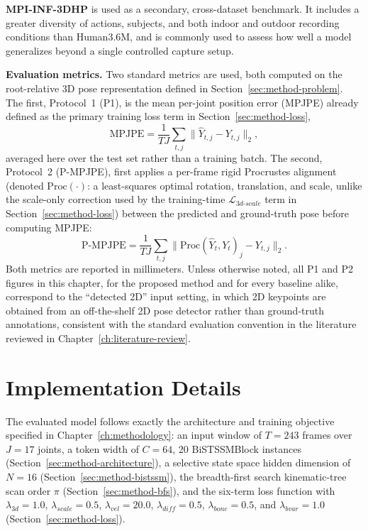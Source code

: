 \textbf{MPI-INF-3DHP} \cite{mehta2017mpiinf3dhp} is used as a secondary,
cross-dataset benchmark. It includes a greater diversity of actions,
subjects, and both indoor and outdoor recording conditions than
Human3.6M, and is commonly used to assess how well a model generalizes
beyond a single controlled capture setup.

\textbf{Evaluation metrics.} Two standard metrics are used, both computed
on the root-relative 3D pose representation defined in
Section~\ref{sec:method-problem}. The first, Protocol~1 (P1), is the mean
per-joint position error (MPJPE) already defined as the primary training
loss term in Section~\ref{sec:method-loss},
\begin{equation}
\text{MPJPE} = \frac{1}{TJ} \sum_{t,j} \big\lVert \hat{Y}_{t,j} - Y_{t,j} \big\rVert_2 ,
\end{equation}
averaged here over the test set rather than a training batch. The second,
Protocol~2 (P-MPJPE), first applies a per-frame rigid Procrustes alignment
(denoted $\mathrm{Proc}(\cdot)$: a least-squares optimal rotation,
translation, and scale, unlike the scale-only correction used by the
training-time $\mathcal{L}_{3d\text{-}scale}$ term in
Section~\ref{sec:method-loss}) between the predicted and ground-truth
pose before computing MPJPE:
\begin{equation}
\text{P-MPJPE} = \frac{1}{TJ} \sum_{t,j} \big\lVert \mathrm{Proc}(\hat{Y}_{t}, Y_{t})_{j} - Y_{t,j} \big\rVert_2 .
\end{equation}
Both metrics are reported in millimeters. Unless otherwise noted, all P1
and P2 figures in this chapter, for the proposed method and for every
baseline alike, correspond to the ``detected 2D'' input setting, in which 2D
keypoints are obtained from an off-the-shelf 2D pose detector rather than
ground-truth annotations, consistent with the standard evaluation
convention in the literature reviewed in Chapter~\ref{ch:literature-review}.

\section{Implementation Details}
\label{sec:results-implementation}

The evaluated model follows exactly the architecture and training
objective specified in Chapter~\ref{ch:methodology}: an input window of
$T=243$ frames over $J=17$ joints, a token width of $C=64$, 20
BiSTSSMBlock instances (Section~\ref{sec:method-architecture}), a
selective state space hidden dimension of $N=16$
(Section~\ref{sec:method-bistssm}), the breadth-first search
kinematic-tree scan order $\pi$ (Section~\ref{sec:method-bfs}), and the
six-term loss function with $\lambda_{3d}=1.0$, $\lambda_{scale}=0.5$,
$\lambda_{vel}=20.0$, $\lambda_{diff}=0.5$, $\lambda_{bone}=0.5$, and
$\lambda_{bvar}=1.0$ (Section~\ref{sec:method-loss}).

